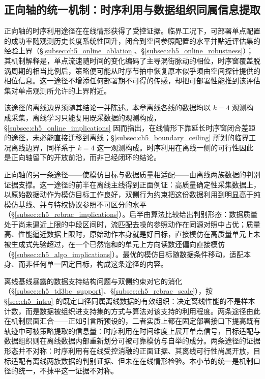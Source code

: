 \subsection{正向轴的统一机制：时序利用与数据组织同属信息提取}\label{subsec:ch5_discussion_positive}

正向轴的时序利用途径在在线情形获得了受控证据。临界工况下，可部署单点配置的成功率随观测历史长度系统性回升，闭合到空间参照配置的水平并贴近评估集的经验上界（\S\ref{subsec:ch5_online_ablation}、\S\ref{subsec:ch5_online_robustness}）；其机制解释是，单点流速随时间的变化编码了主导涡街脉动的相位，时序窗覆盖脱涡周期的相当比例后，策略便可能从时序节拍中恢复原本似乎须由空间探针提供的相位信息。这一途径不增添任何部署期不可得的传感，却把可部署性能推到该评估集对单点观测所允许的上界附近。

该途径的离线边界须随其结论一并陈述。本章离线各线的数据均以 $k=4$ 观测构成采集，离线学习只能复用既采数据的观测构成，\S\ref{subsec:ch5_online_implications} 因而指出，在线情形下靠延长时序窗闭合差距的途径，未必能直接迁移到离线；\S\ref{subsec:ch5_boundary_ceiling} 所划的临界工况离线边界，同样系于 $k=4$ 这一观测构成。时序利用在离线一侧的可行性因此是正向轴留下的开放前沿，而非已经闭环的结论。

正向轴的另一条途径——使模仿目标与数据质量相适配——由离线两族数据的判别证据支撑。这一途径的前半在离线主线得到正面例证：高质量确定性采集数据上，以原始数据动作为模仿目标工作良好，双侧行为约束把这份数据利用到明显高于纯模仿基线、并与特权协议参照不可区分的水平（\S\ref{subsec:ch5_rebrac_implications}）。后半由算法比较给出判别形态：数据质量处于尚未逼近上限的中段区间时，流匹配去噪的参照动作在同源对照中占优；质量高、性能逼近数据上限时，原始动作本身就是好目标，直接模仿在高质量单元上未被生成式先验超过，在一个已然饱和的单元上方向读数还偏向直接模仿（\S\ref{subsec:ch5_algo_implications}）。最优的模仿目标随数据条件移动，适配本身、而非任何单一固定目标，构成这条途径的内容。

离线基线暴露的数据支持结构问题与双侧约束对它的消化（\S\ref{subsec:ch5_td3bc_support}、\S\ref{subsec:ch5_rebrac_scale}），按 \S\ref{sec:ch5_intro} 的既定口径同属离线数据的有效组织：决定离线性能的不是样本计数，而是数据被组织进支持集的方式与算法对该支持的利用程度。两条途径由此在机制层面汇合——正如引言所预设的，二者实质上都在固定部署接口下提高既有轨迹中可被策略提取的信息量：时序利用在时间维度上展开单点信号，目标适配与数据组织则在离线数据内部重新划分可被可靠模仿与自举的成分。两条途径的证据形态并不对称：时序利用有在线受控消融的正面证据、其离线可行性尚属开放，目标适配有离线两族数据的判别证据、但未在在线情形检验。本小节的统一是机制口径的统一，不抹平这一证据不对称。


